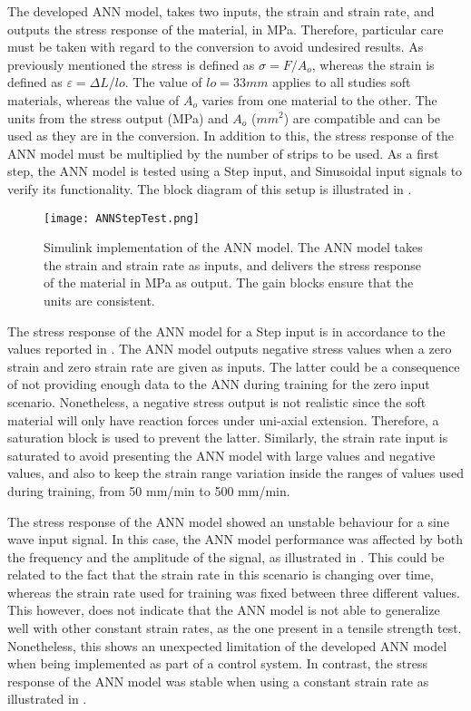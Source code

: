 The developed ANN model, takes two inputs, the strain and strain rate, and outputs the stress response of the material, in MPa. Therefore, particular care must be taken with regard to the conversion to avoid undesired results. As previously mentioned the stress is defined as $\sigma = F/A_o$, whereas the strain is defined as $\varepsilon = \Delta L / lo$. The value of $lo=33mm$ applies to all studies soft materials, whereas the value of $A_o$ varies from one material to the other. The units from the stress output (MPa) and $A_o$ ($mm^2$) are compatible and can be used as they are in the conversion. In addition to this, the stress response of the ANN model must be multiplied by the number of strips to be used. As a first step, the ANN model is tested using a Step input, and Sinusoidal input signals to verify its functionality. The block diagram of this setup is illustrated in .

\begin{figure}[hbtp!]
    \centering
    \texttt{[image: ANNStepTest.png]}
    \caption{ Simulink implementation of the ANN model. The ANN model takes the strain and strain rate as inputs, and delivers the stress response of the material in MPa as output. The gain blocks ensure that the units are consistent. }
    \label{fig:ANNStepTest}
\end{figure}

The stress response of the ANN model for a Step input is in accordance to the values reported in . The ANN model outputs negative stress values when a zero strain and zero strain rate are given as inputs. The latter could be a consequence of not providing enough data to the ANN during training for the zero input scenario. Nonetheless, a negative stress output is not realistic since the soft material will only have reaction forces under uni-axial extension. Therefore, a saturation block is used to prevent the latter. Similarly, the strain rate input is saturated to avoid presenting the ANN model with large values and negative values, and also to keep the strain range variation inside the ranges of values used during training, from 50 mm/min to 500 mm/min.

The stress response of the ANN model showed an unstable behaviour for a sine wave input signal. In this case, the ANN model performance was affected by both the frequency and the amplitude of the signal, as illustrated in . This could be related to the fact that the strain rate in this scenario is changing over time, whereas the strain rate used for training was fixed between three different values. This however, does not indicate that the ANN model is not able to generalize well with other constant strain rates, as the one present in a tensile strength test. Nonetheless, this shows an unexpected limitation of the developed ANN model when being implemented as part of a control system. In contrast, the stress response of the ANN model was stable when using a constant strain rate as illustrated in .

